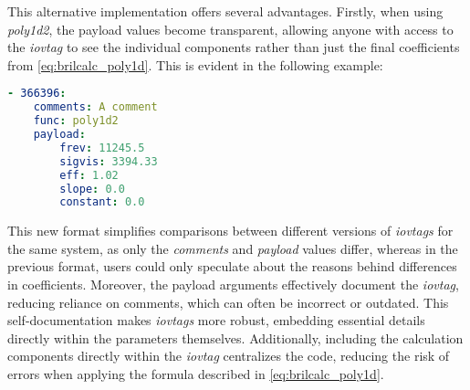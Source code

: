 


This alternative implementation offers several advantages. Firstly, when using \textit{poly1d2}, the payload values become transparent, allowing anyone with access to the \textit{iovtag} to see the individual components rather than just the final coefficients from \autoref{eq:brilcalc_poly1d}. This is evident in the following example:

\begin{lstlisting}[language=Yaml]
- 366396:
    comments: A comment
    func: poly1d2
    payload:
        frev: 11245.5
        sigvis: 3394.33
        eff: 1.02
        slope: 0.0
        constant: 0.0
\end{lstlisting}

This new format simplifies comparisons between different versions of \textit{iovtags} for the same system, as only the \textit{comments} and \textit{payload} values differ, whereas in the previous format, users could only speculate about the reasons behind differences in coefficients. Moreover, the payload arguments effectively document the \textit{iovtag}, reducing reliance on comments, which can often be incorrect or outdated. This self-documentation makes \textit{iovtags} more robust, embedding essential details directly within the parameters themselves. Additionally, including the calculation components directly within the \textit{iovtag} centralizes the code, reducing the risk of errors when applying the formula described in \autoref{eq:brilcalc_poly1d}.


